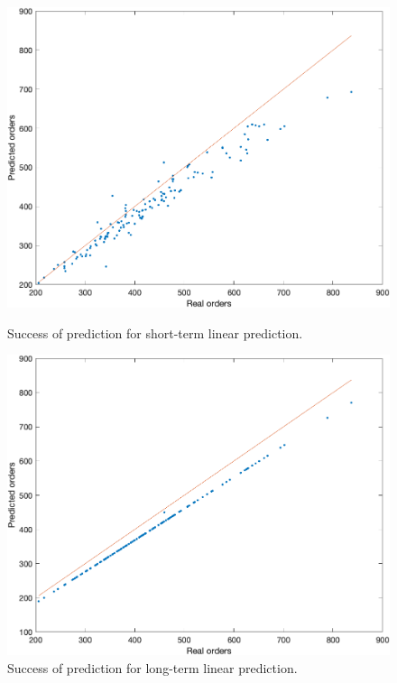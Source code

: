     \begin{figure}[!ht]
        \begin{minipage}{0.45\textwidth}
            \centering
            \includegraphics[width=1\textwidth]{figures/expCompLP.png}
            \caption{Success of prediction for short-term linear prediction.}
            \label{fig:stlpres}
        \end{minipage}\hfill
        \begin{minipage}{0.45\textwidth}
            \centering
            \includegraphics[width=1\textwidth]{figures/expCompLTLP.png}
            \caption{Success of prediction for long-term linear prediction.}
            \label{fig:eltlpres}
        \end{minipage}\hfill
    \end{figure}
